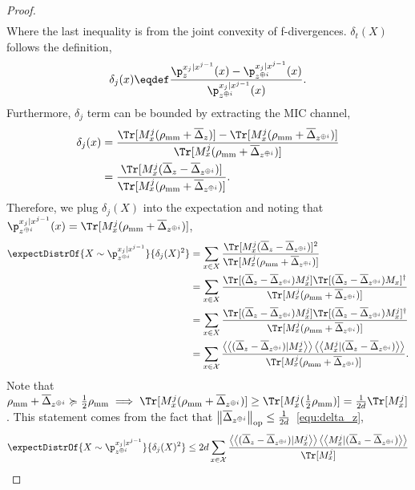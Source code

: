 \begin{proof}
\begin{align*}
\end{align*}
 Where the last inequality is from the joint convexity of f-divergences. $\delta_t(X)$ follows the definition,
\begin{align*}
    \delta_j(x) \eqdef \frac{\p^{\out_{j}|\out^{j-1}}_{z}(x)-\p^{\out_{j}|\out^{j-1}}_{z^{\oplus i}}(x)}{\p^{\out_{j}|\out^{j-1}}_{z^{\oplus i}}(x)}.
\end{align*}
Furthermore, $\delta_j$ term can be bounded by extracting the MIC channel,
\begin{align*}
    \delta_j(x) &= \frac{\Tr[M_x^j (\qmm + \barDelta_{\ptb})] - \Tr[M_x^j (\qmm + \barDelta_{\ptb^{\oplus i}})]}{\Tr[M_x^j (\qmm + \barDelta_{\ptb^{\oplus i}})]} \\
    &= \frac{\Tr[M_x^j (\barDelta_{\ptb} - \barDelta_{\ptb ^{\oplus i}})]}{\Tr[M_x^j (\qmm + \barDelta_{\ptb^{\oplus i}})]}.
\end{align*}
Therefore, we plug $\delta_j(X)$ into the expectation and noting that $\p^{\out_{j}|\out^{j-1}}_{z^{\oplus i}}(x) = \Tr[M_x^j (\qmm + \barDelta_{\ptb^{\oplus i}})]$,
\begin{align*}
    \expectDistrOf{X \sim \p^{\out_{j}|\out^{j-1}}_{z^{\oplus i}}}{\delta_j(X)^2} &= \sum_{x \in X} \frac{\Tr[M_x^j (\barDelta_{\ptb} - \barDelta_{\ptb ^{\oplus i}})]^2}{\Tr[M_x^j (\qmm + \barDelta_{\ptb^{\oplus i}})]} \\
    &= \sum_{x \in X} \frac{\Tr[(\barDelta_{\ptb} - \barDelta_{\ptb ^{\oplus i}}) M_x^j] \Tr[(\barDelta_{\ptb} - \barDelta_{\ptb ^{\oplus i}}) M_x]^{\dagger}}{\Tr[M_x^j (\qmm + \barDelta_{\ptb^{\oplus i}})]} \\
    &= \sum_{x \in X} \frac{\Tr[(\barDelta_{\ptb} - \barDelta_{\ptb ^{\oplus i}}) M_x^j] \Tr[(\barDelta_{\ptb} - \barDelta_{\ptb ^{\oplus i}}) M_x^j]^{\dagger}}{\Tr[M_x^j (\qmm + \barDelta_{\ptb^{\oplus i}})]} \\
    &= \sum_{\out \in \mathcal{X}} \frac{\vvdotprod{(\barDelta_{\ptb} - \barDelta_{\ptb ^{\oplus i}})}{M_x^j}\vvdotprod{M_x^j}{(\barDelta_{\ptb} - \barDelta_{\ptb ^{\oplus i}})}}{\Tr[M_x^j(\qmm + \barDelta_{\ptb^{\oplus i}})]}.
\end{align*}
Note that $\qmm + \barDelta_{\ptb^{\oplus i}} \succcurlyeq \frac{1}{2} \qmm \implies \Tr[M_x^j(\qmm + \barDelta_{\ptb^{\oplus i}})] \geq \Tr[M_x^j(\frac{1}{2} \qmm)] = \frac{1}{2 \dims}\Tr[M_x^j]$. This statement comes from the fact that ${\left\|{\overline{\Delta}}_{{z}^{\oplus i}}\right\|}_{\text{op}} \leq \frac{1}{2 d}$~\eqref{equ:delta_z},
\begin{align*}
   \expectDistrOf{X \sim \p^{\out_{j}|\out^{j-1}}_{z^{\oplus i}}}{\delta_j(X)^2} &\le  2 \dims \sum_{\out \in \mathcal{X}} \frac{\vvdotprod{(\barDelta_{\ptb} - \barDelta_{\ptb ^{\oplus i}})}{M_x^j}\vvdotprod{M_x^j}{(\barDelta_{\ptb} - \barDelta_{\ptb ^{\oplus i}})}}{\Tr[M_x^j]} \\

\end{align*}
\end{proof}
